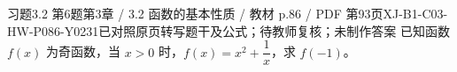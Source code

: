 \par\noindent\begin{minipage}{\linewidth}
\begin{bankitem}{习题3.2 第6题}{第3章 / 3.2 函数的基本性质 / 教材 p.86 / PDF 第93页}{XJ-B1-C03-HW-P086-Y0231}{已对照原页转写题干及公式；待教师复核；未制作答案}
已知函数 $f(x)$ 为奇函数，当 $x>0$ 时，$f(x)=x^2+\dfrac1x$，求 $f(-1)$。
\end{bankitem}
\end{minipage}\par\medskip
